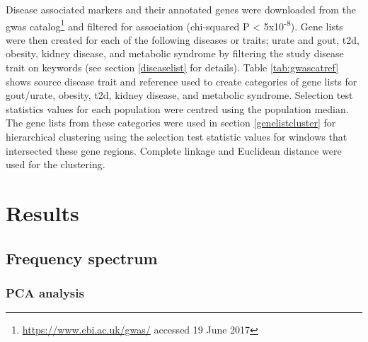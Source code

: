 \documentclass[]{report}
\begin{document}
Disease associated markers and their annotated genes were downloaded
from the \gls{gwas} catalog\footnote{\url{https://www.ebi.ac.uk/gwas/}
  accessed 19 June 2017} \citep{MacArthur2017} and filtered for
association (chi-squared P \textless{} 5x10\textsuperscript{-8}). Gene
lists were then created for each of the following diseases or traits;
urate and gout, \gls{t2d}, obesity, kidney disease, and metabolic
syndrome by filtering the study disease trait on keywords (see section
\ref{diseaselist} for details). Table \ref{tab:gwascatref} shows source
disease trait and reference used to create categories of gene lists for
gout/urate, obesity, \gls{t2d}, kidney disease, and metabolic syndrome.
Selection test statistics values for each population were centred using
the population median. The gene lists from these categories were used in
section \ref{genelistcluster} for hierarchical clustering using the
selection test statistic values for windows that intersected these gene
regions. Complete linkage and Euclidean distance were used for the
clustering.




\section{Results}\label{results-1}

\subsection{Frequency spectrum}\label{frequency-spectrum-1}

\subsubsection{PCA analysis}\label{pcaresults}
\end{document}
